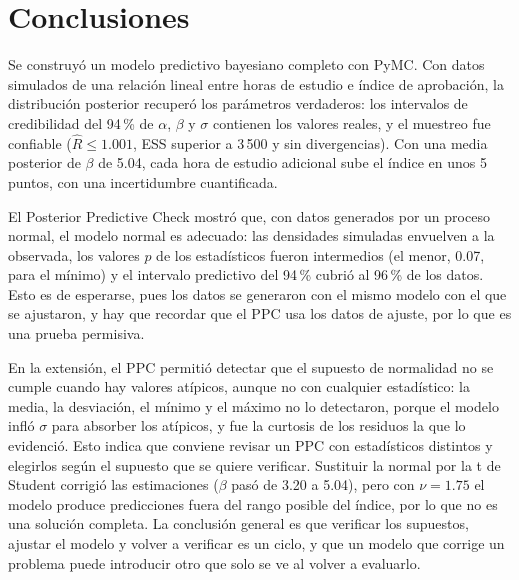 \documentclass[11pt,letterpaper]{article}
\begin{document}
\section{Conclusiones}

Se construyó un modelo predictivo bayesiano completo con PyMC. Con datos simulados de una relación lineal entre horas de estudio e índice de aprobación, la distribución posterior recuperó los parámetros verdaderos: los intervalos de credibilidad del 94\,\% de $\alpha$, $\beta$ y $\sigma$ contienen los valores reales, y el muestreo fue confiable ($\hat{R} \le 1.001$, ESS superior a 3\,500 y sin divergencias). Con una media posterior de $\beta$ de 5.04, cada hora de estudio adicional sube el índice en unos 5 puntos, con una incertidumbre cuantificada.

El Posterior Predictive Check mostró que, con datos generados por un proceso normal, el modelo normal es adecuado: las densidades simuladas envuelven a la observada, los valores $p$ de los estadísticos fueron intermedios (el menor, 0.07, para el mínimo) y el intervalo predictivo del 94\,\% cubrió al 96\,\% de los datos. Esto es de esperarse, pues los datos se generaron con el mismo modelo con el que se ajustaron, y hay que recordar que el PPC usa los datos de ajuste, por lo que es una prueba permisiva.

En la extensión, el PPC permitió detectar que el supuesto de normalidad no se cumple cuando hay valores atípicos, aunque no con cualquier estadístico: la media, la desviación, el mínimo y el máximo no lo detectaron, porque el modelo infló $\sigma$ para absorber los atípicos, y fue la curtosis de los residuos la que lo evidenció. Esto indica que conviene revisar un PPC con estadísticos distintos y elegirlos según el supuesto que se quiere verificar. Sustituir la normal por la t de Student corrigió las estimaciones ($\beta$ pasó de 3.20 a 5.04), pero con $\nu = 1.75$ el modelo produce predicciones fuera del rango posible del índice, por lo que no es una solución completa. La conclusión general es que verificar los supuestos, ajustar el modelo y volver a verificar es un ciclo, y que un modelo que corrige un problema puede introducir otro que solo se ve al volver a evaluarlo.

\end{document}
